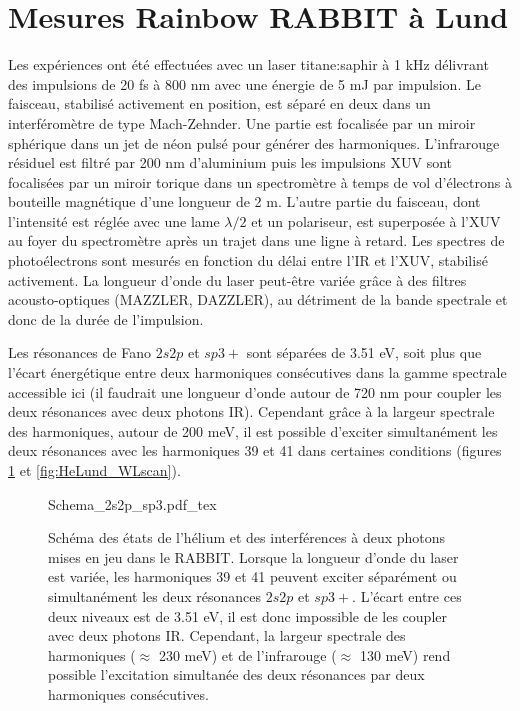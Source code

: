 \section{Mesures Rainbow RABBIT à Lund}
Les expériences ont été effectuées avec un laser titane:saphir à 1 kHz délivrant des impulsions de 20 fs à 800 nm avec une énergie de 5 mJ par impulsion. Le faisceau, stabilisé activement en position, est séparé en deux dans un interféromètre de type Mach-Zehnder. Une partie est focalisée par un miroir sphérique dans un jet de néon pulsé pour générer des harmoniques. L'infrarouge résiduel est filtré par 200 nm d'aluminium puis les impulsions XUV sont focalisées par un miroir torique dans un spectromètre à temps de vol d'électrons à bouteille magnétique d'une longueur de 2 m. L'autre partie du faisceau, dont l'intensité est réglée avec une lame $\lambda /2$ et un polariseur, est superposée à l'XUV au foyer du spectromètre après un trajet dans une ligne à retard. Les spectres de photoélectrons sont mesurés en fonction du délai entre l'IR et l'XUV, stabilisé activement. La longueur d'onde du laser peut-être variée grâce à des filtres acousto-optiques (MAZZLER, DAZZLER), au détriment de la bande spectrale et donc de la durée de l'impulsion.

Les résonances de Fano $2s2p$ et $sp3+$ sont séparées de 3.51 eV, soit plus que l'écart énergétique entre deux harmoniques consécutives dans la gamme spectrale accessible ici (il faudrait une longueur d'onde autour de 720 nm pour coupler les deux résonances avec deux photons IR). Cependant grâce à la largeur spectrale des harmoniques, autour de 200 meV, il est possible d'exciter simultanément les deux résonances avec les harmoniques 39 et 41 dans certaines conditions (figures \ref{fig:Schema_2res} et \ref{fig:HeLund_WLscan}).

\begin{figure}
\centering
\def\svgwidth{0.7\textwidth}
{Schema_2s2p_sp3.pdf_tex}
\caption{Schéma des états de l'hélium et des interférences à deux photons mises en jeu dans le RABBIT. Lorsque la longueur d'onde du laser est variée, les harmoniques 39 et 41 peuvent exciter séparément ou simultanément les deux résonances $2s2p$ et $sp3+$. L'écart entre ces deux niveaux est de 3.51 eV, il est donc impossible de les coupler avec deux photons IR. Cependant, la largeur spectrale des harmoniques ($\approx$ 230 meV) et de l'infrarouge ($\approx$ 130 meV) rend possible l'excitation simultanée des deux résonances par deux harmoniques consécutives.} 
\label{fig:Schema_2res}
\end{figure}

